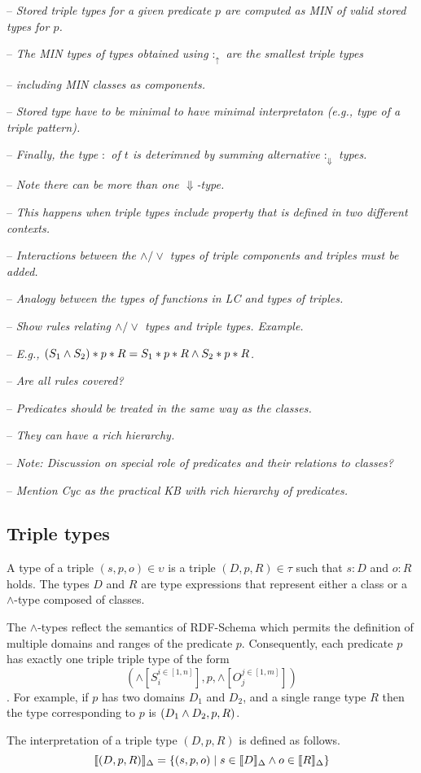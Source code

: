\documentclass[runningheads]{llncs}
\newcommand{\uarr}{\uparrow}
\newcommand{\Darr}{\Downarrow}
\newcommand{\llb}{\llbracket}
\newcommand{\rrb}{\rrbracket}
\newcommand{\notes}[1]{\noindent\begin{small}-- \emph{#1}\hfill\break\end{small}}
\newcommand{\nnotes}[1]{\indent\begin{small}-- \emph{#1}\hfill\break\end{small}}
\begin{document}
\notes{Stored triple types for a given predicate $p$ are computed as MIN of valid stored types for $p$.}
\nnotes{The MIN types of types obtained using $:_\uarr$ are the smallest triple types}
\nnotes{including MIN classes as components.}
\nnotes{Stored type have to be minimal to have minimal interpretaton (e.g., type of a triple pattern).}
\nnotes{Finally, the type $:$ of $t$ is deterimned by summing alternative $:_\Darr$ types.}
\nnotes{Note there can be more than one $\Darr$-type.}
\nnotes{This happens when triple types include property that is defined in two different contexts.}

\notes{Interactions between the $\land/\lor$ types of triple components and triples must be added.}
\nnotes{Analogy between the types of functions in LC and types of triples.}
\nnotes{Show rules relating $\land/\lor$ types and triple types. Example.}
\nnotes{E.g., $(S_1\land\/S_2)*p*R = S_1*p*R\land\/S_2*p*R$.}
\nnotes{Are all rules covered?}

\notes{Predicates should be treated in the same way as the classes.}
\nnotes{They can have a rich hierarchy.}
\nnotes{\emph{Note:} Discussion on special role of predicates and their relations to classes?}
\nnotes{Mention Cyc as the practical KB with rich hierarchy of predicates.}





\subsection{Triple types\label{sec:3-types}}

A type of a triple $(s,p,o)\in\upsilon$ is a triple
$(D,p,R)\in\tau$ such that $s:D$ and $o:R$ holds. The types
$D$ and $R$ are type expressions that represent either a class or
a $\land$-type composed of classes.

The $\land$-types reflect the semantics of RDF-Schema \cite{rdfschema}
which permits the definition of multiple domains and ranges of the
predicate $p$. Consequently, each predicate $p$ has exactly one triple
triple type of the form
$$(\land[S_i^{i\in[1,n]}],p,\land[O_j^{j\in[1,m]}])$$.
For example, if $p$ has two domains $D_1$ and $D_2$, and a single
range type $R$ then the type corresponding to $p$ is
$(D_1\land\/D_2,p,R)$.

The interpretation of a triple type $(D,p,R)$ is defined as
follows.
$$\llb(D,p,R)\rrb_\Delta=\{(s,p,o)\mid\/s\in\llb\/D\rrb_\Delta\land\/o\in\llb\/R\rrb_\Delta \}$$
\end{document}
